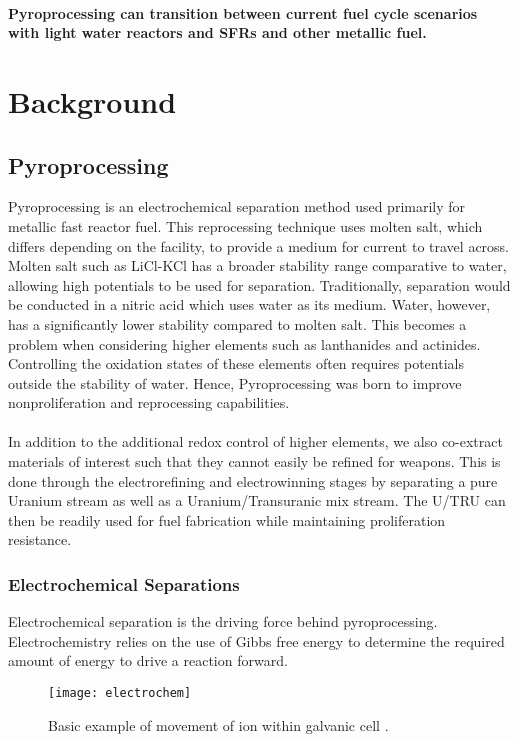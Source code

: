 \paragraph{Pyroprocessing can transition between current fuel cycle scenarios with light water reactors and SFRs and other metallic fuel.}


\section{Background}
\subsection{Pyroprocessing}
Pyroprocessing is an electrochemical separation method used primarily for metallic fast reactor fuel.
This reprocessing technique uses molten salt, which differs depending on the facility, to provide a medium for current to travel across.
Molten salt such as LiCl-KCl has a broader stability range comparative to water, allowing high potentials to be used for separation.
Traditionally, separation would be conducted in a nitric acid which uses water as its medium.
Water, however, has a significantly lower stability compared to molten salt.
This becomes a problem when considering higher elements such as lanthanides and actinides.
Controlling the oxidation states of these elements often requires potentials outside the stability of water.
Hence, Pyroprocessing was born to improve nonproliferation and reprocessing capabilities.
\\ \\
In addition to the additional redox control of higher elements, we also co-extract materials of interest such that they cannot easily be refined for weapons.
This is done through the electrorefining and electrowinning stages by separating a pure Uranium stream as well as a Uranium/Transuranic mix stream. 
The U/TRU can then be readily used for fuel fabrication while maintaining proliferation resistance.

\subsubsection{Electrochemical Separations}
Electrochemical separation is the driving force behind pyroprocessing. Electrochemistry relies on the use of Gibbs free energy to determine the required amount of energy to drive a reaction forward.

\begin{figure}[h]
	\centering
	\texttt{[image: electrochem]}
	\caption{Basic example of movement of ion within galvanic cell \cite{angel}.}
\end{figure}

